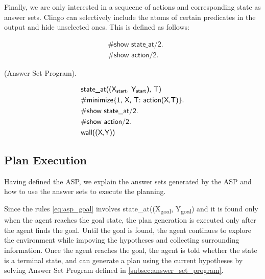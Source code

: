 Finally, we are only interested in a sequecne of actions and corresponding state as answer sets. 
Clingo can selectively include the atoms of certain predicates in the output and hide unselected ones. 
This is defined as follows:

\begin{equation}
\begin{split}
&\textsf{\#show state\_at/2.} \\
&\textsf{\#show action/2.}
\end{split}
\end{equation}

\begin{examp} \normalfont (Answer Set Program).

\begin{equation}
\begin{split}
&\textsf{state\_at((X\textsubscript{start}, Y\textsubscript{start}), T)}\\
&\textsf{\#minimize\{1, X, T: action(X,T)\}}.\\
&\textsf{\#show state\_at/2.} \\
&\textsf{\#show action/2.}\\
&\textsf{wall((X,Y))}
\end{split}
\end{equation}
\end{examp}

\subsection{Plan Execution}
\label{subsec:plan_execution}
Having defined the ASP, we explain the answer sets generated by the ASP and how to use the answer sets to execute the planning.

Since the rules \ref{eq:asp_goal} involves \textsf{state\_at((X\textsubscript{goal}, Y\textsubscript{goal})} and it is found only when the agent reaches the goal state, the plan generation is executed only after the agent finds the goal. 
Until the goal is found, the agent continues to explore the environment while impoving the hypotheses and collecting surrounding information.
Once the agent reaches the goal, the agent is told whether the state is a terminal state, and 
can generate a plan using the current hypotheses by solving Answer Set Program defined in \ref{subsec:answer_set_program}.

